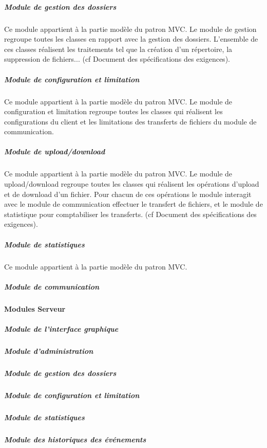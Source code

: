 \documentclass[10pt,a4paper]{report}
\begin{document}
	
				\subparagraph{Module de gestion des dossiers}
				\begin{flushleft}
				Ce module appartient à la partie modèle du patron MVC. Le module de gestion regroupe  toutes les classes en rapport avec la gestion des dossiers. L'ensemble de ces classes réalisent les traitements tel que la création d'un répertoire, la suppression de fichiers... (cf Document des spécifications des exigences).\\ 
				\end{flushleft}
	
				\subparagraph{Module de configuration et limitation}	
				\begin{flushleft}
				Ce module appartient à la partie modèle du patron MVC. Le module de configuration et limitation regroupe toutes les classes qui réalisent les configurations du client et les limitations des transferts de fichiers du module de communication.
				\end{flushleft}
	
				\subparagraph{Module de upload/download}
				\begin{flushleft}
				Ce module appartient à la partie modèle du patron MVC. Le module de upload/download regroupe toutes les classes qui réalisent les opérations d'upload et de download d'un fichier. Pour chacun de ces opérations le module interagit avec le module de communication effectuer le transfert de fichiers, et le module de statistique pour comptabiliser les transferts. (cf Document des spécifications des exigences).
				\end{flushleft}
	
				\subparagraph{Module de statistiques}
				Ce module appartient à la partie modèle du patron MVC.
	
				\subparagraph{Module de communication}


			\paragraph{Modules Serveur}

				\subparagraph{Module de l'interface graphique}
	
	
				\subparagraph{Module d'administration}
	
	
				\subparagraph{Module de gestion des dossiers}
	
	
				\subparagraph{Module de configuration et limitation}	
				
	
				\subparagraph{Module de statistiques}

	
				\subparagraph{Module des historiques des événements}
	
\end{document}
